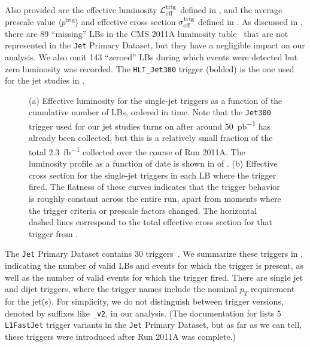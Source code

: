 \documentclass[aps,prd,twocolumn,preprintnumbers,nofootinbib,longbibliography,floatfix,superscriptaddress]{revtex4-1}
\begin{document}
\begin{table*}[t]
\begin{center}
{%
Also provided are the effective luminosity $\mathcal{L}^\text{trig}_{\rm eff}$ defined in , and the average prescale value $\langle p^\text{trig} \rangle$ and effective cross section $\sigma^\text{trig}_{\rm eff}$ defined in .
%
As discussed in , there are 89 ``missing'' LBs in the CMS 2011A luminosity table~\cite{CMS:luminosity2011} that are not represented in the \texttt{Jet} Primary Dataset, but they have a negligible impact on our analysis.
%
We also omit 143 ``zeroed'' LBs during which events were detected but zero luminosity was recorded.
%
The \texttt{HLT\_Jet300} trigger (bolded) is the one used for the jet studies in .
}
\label{table:full_list_of_triggers}
\end{center}
\end{table*}


\begin{figure*}[t]
  \centering
  \caption{%
  (a) Effective luminosity for the single-jet triggers as a function of the cumulative number of LBs, ordered in time.
  Note that the \texttt{Jet300} trigger used for our jet studies turns on after around \SI{50}{pb^{-1}} has already been collected, but this is a relatively small fraction of the total \SI{2.3}{fb^{-1}} collected over the course of Run 2011A.
  The luminosity profile as a function of date is shown in  of .
  (b) Effective cross section for the single-jet triggers in each LB where the trigger fired.
  The flatness of these curves indicates that the trigger behavior is roughly constant across the entire run, apart from moments where the trigger criteria or prescale factors changed.
   The horizontal dashed lines correspond to the total effective cross section for that trigger from .
}
     \label{figures:integrated_effective_luminosity_and_xsec}
\end{figure*}


The \texttt{Jet} Primary Dataset contains 30 triggers~\cite{Khachatryan:2016bia}.
%
We summarize these triggers in , indicating the number of valid LBs and events for which the trigger is present, as well as the number of valid events for which the trigger fired.
%
There are single jet and dijet triggers, where the trigger names include the nominal $p_T$ requirement for the jet(s).
%
For simplicity, we do not distinguish between trigger versions, denoted by suffixes like \texttt{\_v2}, in our analysis.
%
(The documentation for  lists 5 \texttt{L1FastJet} trigger variants in the \texttt{Jet} Primary Dataset, but as far as we can tell, these triggers were introduced after Run 2011A was complete.)
\end{document}
